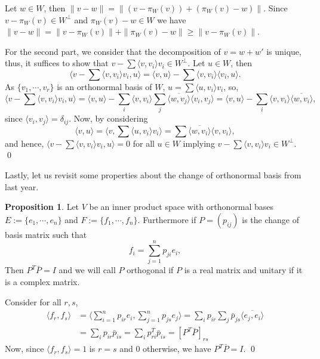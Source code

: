 \documentclass[
]{article}
\theoremstyle{definition}
\newtheorem{prop}{Proposition}[section]
\theoremstyle{definition}
\begin{document}
Let \(w \in W\), then
\(\|v - w\| = \|(v - \pi_W(v)) + (\pi_W(v) - w)\|\). Since
\(v - \pi_W(v) \in W^\bot\) and \(\pi_W(v) - w \in W\) we have
\(\|v - w\| = \|v - \pi_W(v)\| + \|\pi_W(v) - w\| \ge \|v - \pi_W(v)\|\).

For the second part, we consider that the decomposition of
\(v = w + w'\) is unique, thus, it suffices to show that
\(v - \sum \langle v, v_i \rangle v_i \in W^\bot\). Let \(u \in W\),
then \[\langle v - \sum \langle v, v_i \rangle v_i, u \rangle = 
    \langle v, u \rangle - \sum \langle v, v_i \rangle \langle v_i, u \rangle.\]
As \(\{v_1, \cdots, v_r\}\) is an orthonormal basis of \(W\),
\(u = \sum \langle u, v_i \rangle v_i\), so,
\[\langle v - \sum \langle v, v_i \rangle v_i, u \rangle = 
    \langle v, u \rangle - \sum_i \langle v, v_i \rangle \sum_j 
    \overline{\langle w, v_j \rangle} \langle v_i, v_j \rangle = 
    \langle v, u \rangle - \sum_i \langle v, v_i \rangle \overline{\langle w, 
    v_i \rangle},\] since \(\langle v_i, v_j \rangle = \delta_{ij}\).
Now, by considering
\[\langle v, u \rangle = \langle v, \sum \langle u, v_i \rangle v_i \rangle = 
    \sum \overline{\langle w, v_i \rangle} \langle v, v_i \rangle,\] and
hence, \(\langle v - \sum \langle v, v_i \rangle v_i, u \rangle = 0\)
for all \(u \in W\) implying
\(v - \sum \langle v, v_i \rangle v_i \in W^\bot\). \qed

Lastly, let us revisit some properties about the change of orthonormal
basis from last year.

\begin{prop}
  Let \(V\) be an inner product space with orthonormal bases 
  \(E := \{e_1, \cdots, e_n\}\) and \(F := \{f_1, \cdots, f_n\}\). Furthermore 
  if \(P = (p_{ij})\) is the change of basis matrix such that 
  \[f_i = \sum_{j = 1}^n p_{ji}e_i,\]
  Then \(P^T \bar{P} = I\) and we will call \(P\) orthogonal if \(P\) is a real 
  matrix and unitary if it is a complex matrix.
\end{prop}
\proof

Consider for all \(r, s\), \begin{align*}
    \langle f_r, f_s \rangle & = \langle \sum_{i = 1}^n p_{ir}e_i, 
      \sum_{j = 1}^n p_{js}e_j \rangle
      = \sum_i p_{ir} \sum_j \bar{p}_{js} \overline{\langle e_j, e_i \rangle}\\
    & = \sum_i p_{ir} \bar{p}_{is} = \sum_i p^T_{ri} \bar{p}_{is} = [P^T \bar{P}]_{rs}
  \end{align*} Now, since \(\langle f_r, f_s \rangle = 1\) is \(r = s\)
and 0 otherwise, we have \(P^T \bar{P} = I\). \qed
\end{document}
